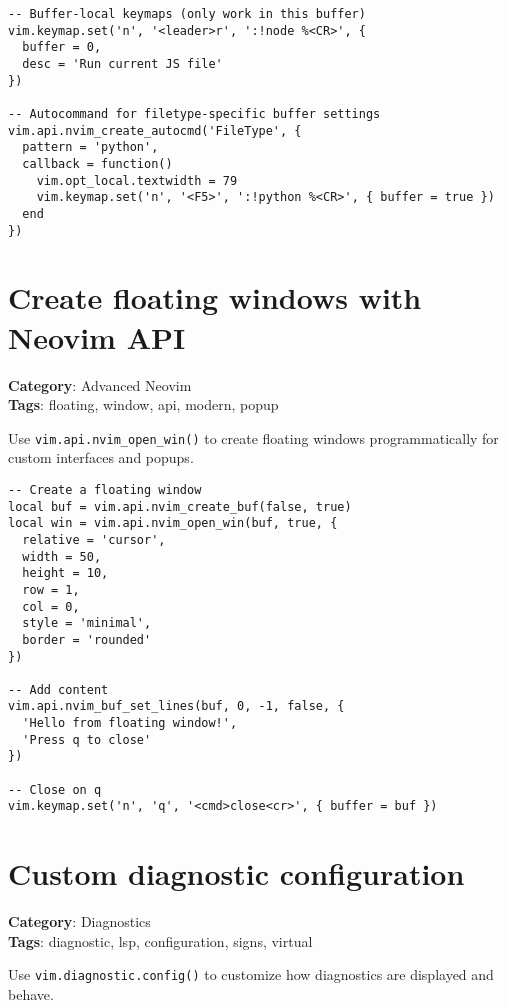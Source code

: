 {{{{{{{\begin{Exa*}{}
\begin{Verbatim}[fontsize=\footnotesize, breaklines, breakanywhere]
-- Buffer-local keymaps (only work in this buffer)
vim.keymap.set('n', '<leader>r', ':!node %<CR>', {
  buffer = 0,
  desc = 'Run current JS file'
})

-- Autocommand for filetype-specific buffer settings
vim.api.nvim_create_autocmd('FileType', {
  pattern = 'python',
  callback = function()
    vim.opt_local.textwidth = 79
    vim.keymap.set('n', '<F5>', ':!python %<CR>', { buffer = true })
  end
})
\end{Verbatim}
\end{Exa*}

\section{Create floating windows with Neovim API}

\textbf{Category}: Advanced Neovim\\ \textbf{Tags}: floating, window, api, modern, popup
\vspace{0.5cm}

Use {\footnotesize \Verb§vim.api.nvim_open_win()§} to create floating windows programmatically for custom interfaces and popups.

\begin{Exa*}{}
\begin{Verbatim}[fontsize=\footnotesize, breaklines, breakanywhere]
-- Create a floating window
local buf = vim.api.nvim_create_buf(false, true)
local win = vim.api.nvim_open_win(buf, true, {
  relative = 'cursor',
  width = 50,
  height = 10,
  row = 1,
  col = 0,
  style = 'minimal',
  border = 'rounded'
})

-- Add content
vim.api.nvim_buf_set_lines(buf, 0, -1, false, {
  'Hello from floating window!',
  'Press q to close'
})

-- Close on q
vim.keymap.set('n', 'q', '<cmd>close<cr>', { buffer = buf })
\end{Verbatim}
\end{Exa*}

\section{Custom diagnostic configuration}

\textbf{Category}: Diagnostics\\ \textbf{Tags}: diagnostic, lsp, configuration, signs, virtual
\vspace{0.5cm}

Use {\footnotesize \Verb§vim.diagnostic.config()§} to customize how diagnostics are displayed and behave.

}}}}}}}
